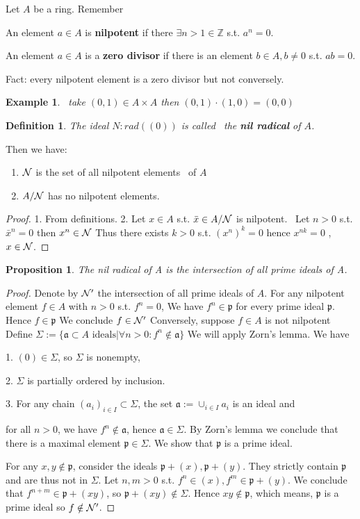 \documentclass[11pt]{article}
\newtheorem{prop}[thm]{Proposition}
\newtheorem{dfn}[thm]{Definition}
\newtheorem{ex}[thm]{Example}
\newcommand{\intg}{\mathbb Z}
\newcommand{\sca}{{\mathfrak a}}
\newcommand{\scp}{{\mathfrak p}}
\newcommand{\caln}{{\cal N}}
\begin{document}
Let $A$ be a ring.
Remember 

    An element $a\in A$ is \textbf{nilpotent} if there $\exists n>1\in \intg$ s.t. $a^n=0$.

    An element $a\in A$ is a \textbf{zero divisor} if there is an element $b\in A, b\neq 0$ s.t. $ab=0$.

Fact: every nilpotent element is a zero divisor but not conversely.

\begin{ex}
     take $(0,1)\in A\times A$ then $(0,1)\cdot(1,0) =(0,0)$
\end{ex}

\begin{dfn}
 The ideal $N:rad((0))$ is called  the \textbf{nil radical} of $A$.
\end{dfn}

Then we have:
\begin{enumerate}
\item $\caln$ is the set of all nilpotent elements  of $A$
\item $A/\caln$ has no nilpotent elements.
\end{enumerate}
\begin{proof}
1. From definitions.
2. Let $x\in A$ s.t. $\bar{x}\in A/\caln$ is nilpotent.
 Let $n>0$ s.t. $\bar{x}^n=0$ then $x^n \in \caln$
Thus there exists $k>0$ s.t. $(x^n)^k=0$ hence $x^{nk}=0$
, $x\in \caln$.
\end{proof}

\begin{prop}
The nil radical of A is the intersection of all prime ideals of A.
\end{prop}
\begin{proof}
Denote by $\caln'$ the intersection of all prime ideals of $A$.
For any nilpotent element $f\in A$ with $n>0$ s.t. $f^n=0$,
We have $f^n\in \scp$ for every prime ideal $\scp$. Hence $f\in \scp$ We conclude $f\in \caln'$
Conversely, suppose $f\in A$ is not nilpotent 
Define $\Sigma:=\{ \sca \subset A\text{ ideals} | \forall n>0: f^n\notin \sca\}$
We will apply Zorn's lemma. 
We have 

    1.  $(0)\in \Sigma$, so $\Sigma$ is nonempty,

    2.  $\Sigma$ is partially ordered by inclusion.

    3.  For any chain $(a_i)_{i\in I}\subset \Sigma$, the set $\sca :=\cup_{i\in I}a_i$ is an ideal and 

    for all $n>0$, 
    we have $f^n \notin \sca$, hence $\sca \in \Sigma$.
By Zorn's lemma we conclude that there is a maximal element $\scp\in \Sigma$.
We show that $\scp$ is a prime ideal.

For any $x,y \notin \scp$, consider the ideals
$\scp+(x), \scp+(y)$. They strictly contain $\scp$ and are thus not in $\Sigma$.
Let $n,m>0$ s.t. $f^n\in (x), f^m\in \scp+(y)$.
We conclude that $f^{n+m}\in \scp+(xy)$, so $\scp+(xy) \notin \Sigma$.
Hence $xy \notin \scp$, which means, $\scp $ is a prime ideal so $f \notin \caln'$.
\end{proof}
\end{document}
